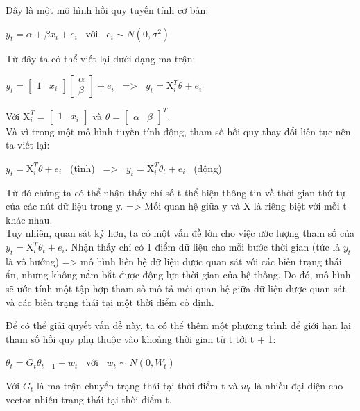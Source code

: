 \documentclass[conference]{IEEEtran}
\begin{document}
Đây là một mô hình hồi quy tuyến tính cơ bản:
\begin{center}

    \(y_{t} = \alpha + \beta x_{i} + e_{i}\) \ với \ \(e_{i} \sim N(0,\sigma^{2})\)

\end{center}

Từ đây ta có thể viết lại dưới dạng ma trận:

\begin{center}

    \(y_{t} = \begin{bmatrix}
        1 & x_{i}
    \end{bmatrix}\begin{bmatrix}
        \alpha \\\beta
    \end{bmatrix} + e_{i}\) \ => \ \(y_{t} = \mathrm{X}_{i}^{T}\theta + e_{i}\)

\end{center}
Với \(\mathrm{X}_{i}^{T} = \begin{bmatrix} 1 & x_{i} \end{bmatrix} \) và \(\theta = \begin{bmatrix} \alpha & \beta \end{bmatrix}^T\).\\

Và vì trong một mô hình tuyến tính động, tham số hồi quy thay đổi liên tục nên ta viết lại:
\begin{center}
    \(y_{t} = \mathrm{X}_{i}^{T}\theta + e_{i}\) \ (tĩnh) \ => \ \(y_{t} = \mathrm{X}_{i}^{T}\theta_{t} + e_{i}\) \ (động)
\end{center}
Từ đó chúng ta có thể nhận thấy chỉ số t thể hiện thông tin về thời gian thứ tự của các nút dữ liệu trong y. => Mối quan hệ giữa y và X là riêng biệt với mỗi t khác nhau.\\
Tuy nhiên, quan sát kỹ hơn, ta có một vấn đề lớn cho việc ước lượng tham số của \(y_{t} = \mathrm{X}_{i}^{T}\theta_{t} + e_{i}\). Nhận thấy chỉ có 1 điểm dữ liệu cho mỗi bước thời gian (tức là \(y_{t}\) là vô hướng) => mô hình liên hệ dữ liệu được quan sát với các biến trạng thái ẩn, nhưng không nắm bắt được động lực thời gian của hệ thống. Do đó, mô hình sẽ ước tính một tập hợp tham số mô tả mối quan hệ giữa dữ liệu được quan sát và các biến trạng thái tại một thời điểm cố định.

Để có thể giải quyết vấn đề này, ta có thể thêm một phương trình để giới hạn lại tham số hồi quy phụ thuộc vào khoảng thời gian từ t tới t + 1:
\begin{center}
    \(\theta_{t} = G_{t}\theta_{t-1} + w_{t}\) \ với \ \(w_{t}\sim N(0,W_{t})\)
\end{center}
Với \(G_{t}\) là ma trận chuyển trạng thái tại thời điểm t và \(w_{t}\) là nhiễu đại diện cho vector nhiễu trạng thái tại thời điểm t.
\end{document}
